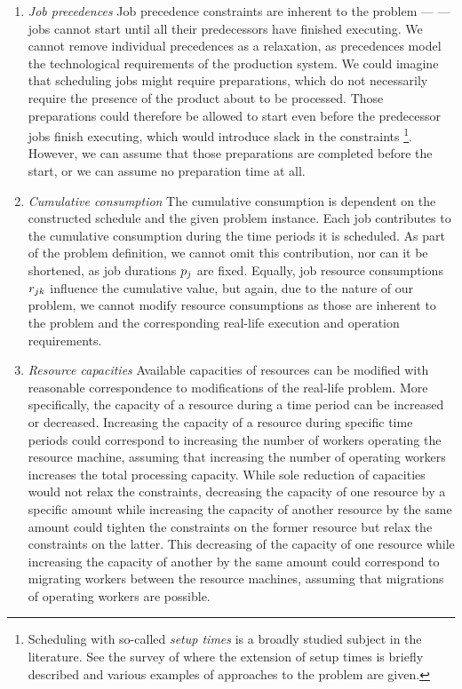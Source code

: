 \begin{enumerate}[label=(\roman*)]
    \item \emph{Job precedences}
    Job precedence constraints are inherent to the problem ---
    --- jobs cannot start until all their predecessors have finished executing.
    We cannot remove individual precedences as a relaxation,
    as precedences model the technological requirements of the production system.
    We could imagine that scheduling jobs might require preparations,
    which do not necessarily require the presence of the product about to be processed.
    Those preparations could therefore be allowed to start even before the predecessor jobs finish executing,
    which would introduce slack in the constraints%
    \footnote{
    Scheduling with so-called \emph{setup times} is a broadly studied subject in the literature.
    See the survey of \citet{Hartmann2010} where the extension of setup times is briefly described
    and various examples of approaches to the problem are given.
    }.
    However, we can assume that those preparations are completed before the start,
    or we can assume no preparation time at all.

    \item \emph{Cumulative consumption}
    The cumulative consumption is dependent on the constructed schedule and the given problem instance.
    Each job contributes to the cumulative consumption during the time periods it is scheduled.
    As part of the problem definition, we cannot omit this contribution,
    nor can it be shortened, as job durations $p_{j}$ are fixed.
    Equally, job resource consumptions $r_{j k}$ influence the cumulative value,
    but again, due to the nature of our problem,
    we cannot modify resource consumptions as those are inherent to the problem
    and the corresponding real-life execution and operation requirements.

    \item \emph{Resource capacities}
    Available capacities of resources can be modified with reasonable correspondence
    to modifications of the real-life problem.
    More specifically, the capacity of a resource during a time period can be increased or decreased.
    Increasing the capacity of a resource during specific time periods could correspond to increasing
    the number of workers operating the resource machine,
    assuming that increasing the number of operating workers increases the total processing capacity.
    While sole reduction of capacities would not relax the constraints,
    decreasing the capacity of one resource by a specific amount
    while increasing the capacity of another resource
    by the same amount could tighten the constraints on the former resource
    but relax the constraints on the latter.
    This decreasing of the capacity of one resource
    while increasing the capacity of another by the same amount
    could correspond to migrating workers between the resource machines,
    assuming that migrations of operating workers are possible.
\end{enumerate}

